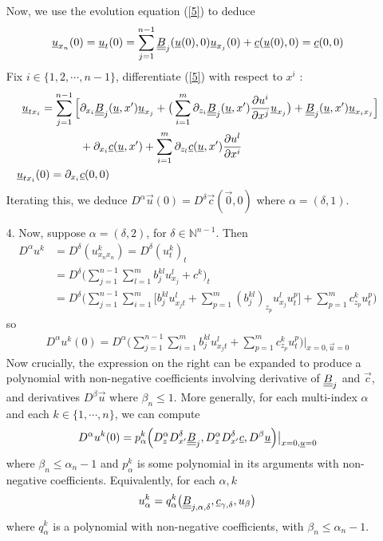 \documentclass[12pt,a4paper]{report}
\newenvironment{proof}
{\begin{changemargin}{1cm}{0.5cm} 
	}%
	{\end{changemargin}
}
\begin{document}
\begin{proof}
\begin{itemize}
Now, we use the evolution equation (\ref{5}) to deduce
\begin{align*}
\underline{u}_{x_n}(0)  = \underline{u}_t (0) = \sum_{j=1}^{n-1} \underline{\underline{B}}_j(\underline{u}(0),0) \underline{u}_{x_j}(0) + \underline{c}(\underline{u}(0),0) = \underline{c}(0,0)
\end{align*}
Fix $i\in \{1,2,\cdots, n-1\}$, differentiate (\ref{5}) with respect to $x^i$ : 
\begin{align*}
\underline{u}_{tx_i} = \sum_{j=1}^{n-1} \Big[ & \partial_{x_i} \underline{\underline{B}}_j(\underline{u},x') \underline{u}_{x_j} + \big( \sum_{i=1}^m \partial_{z_i}\underline{\underline{B}}_j (\underline{u},x') \frac{\partial u^i}{\partial x^j} \underline{u}_{x_j} \big) + \underline{\underline{B}}_j(\underline{u},x')\underline{u}_{x_i x_j} \Big] \\
& + \partial_{x_i} \underline{c}(\underline{u},x') + \sum_{i=1}^m \partial_{z_l} \underline{c}(\underline{u},x') \frac{\partial u^{l}}{\partial x^i} \\
\underline{u}_{tx_i}(0) = \partial_{x_i} & \underline{c}(0,0)
\end{align*}
Iterating this, we deduce $D^{\alpha}\vec{u}(0) = D^{\delta} \vec{c}(\vec{0},0)$ where $\alpha=(\delta,1)$. 

\item[4. ] Now, suppose $\alpha = (\delta,2)$, for $\delta \in \mathbb{N}^{n-1}$. Then
\begin{align*}
D^{\alpha} u^k &= D^{\delta}(u^k_{x_n x_n}) = D^{\delta}(u^k_t)_t \\
&= D^{\delta}\Big( \sum_{j=1}^{n-1}\sum_{l=1}^m b_j^{kl} u_{x_j}^l + c^k \Big)_t \\
&= D^{\delta}\Big( \sum_{j=1}^{n-1} \sum_{i=1}^m \Big[ b_j^{kl} u_{x_j t}^l + \sum_{p=1}^m (b_j^{kl})_{z_p} u_{x_j}^l u_t^p \Big] + \sum_{p=1}^m c_{z_p}^k u_t^p  \Big)
\end{align*}
so
\begin{align*}
D^{\alpha} u^k (0) = D^{\alpha} \Big( \sum_{j=1}^{n-1} \sum_{i=1}^m  b_j^{kl} u_{x_j t}^l + \sum_{p=1}^m c_{z_p}^k u_t^p \Big) \Big|_{x=0,\vec{u}=0}
\end{align*}
Now crucially, the expression on the right can be expanded to produce a polynomial with non-negative coefficients involving derivative of $\underline{\underline{B}}_j$ and $\vec{c}$, and derivatives $D^{\beta} \vec{u}$ where $\beta_n \leq 1$. More generally, for each multi-index $\alpha$ and each $k\in \{1,\cdots, n\}$, we can compute
\begin{align*}
D^{\alpha}u^k(0) = p_{\alpha}^k \Big( D_z^{\alpha} D^{\delta}_{x'}\underline{\underline{B}}_j, D_z^{\alpha}D_{x'}^{\delta} \underline{c}, D^{\beta} \underline{u}\Big) \big|_{x=0,\underline{u}=0}
\end{align*}
where $\beta_n\leq \alpha_n -1$ and $p_{\alpha}^k$ is some polynomial in its arguments with non-negative coefficients. Equivalently, for each $\alpha, k$
\begin{align*}
u_{\alpha}^k = q_{\alpha}^k \big( \underline{\underline{B}}_{j,\alpha,\delta},\underline{c}_{\gamma, \delta},u_{\beta}  \big)
\end{align*}
where $q_{\alpha}^k$ is a polynomial with non-negative coefficients, with $\beta_n \leq \alpha_n -1$.


\end{itemize}
\end{proof}
\end{document}
